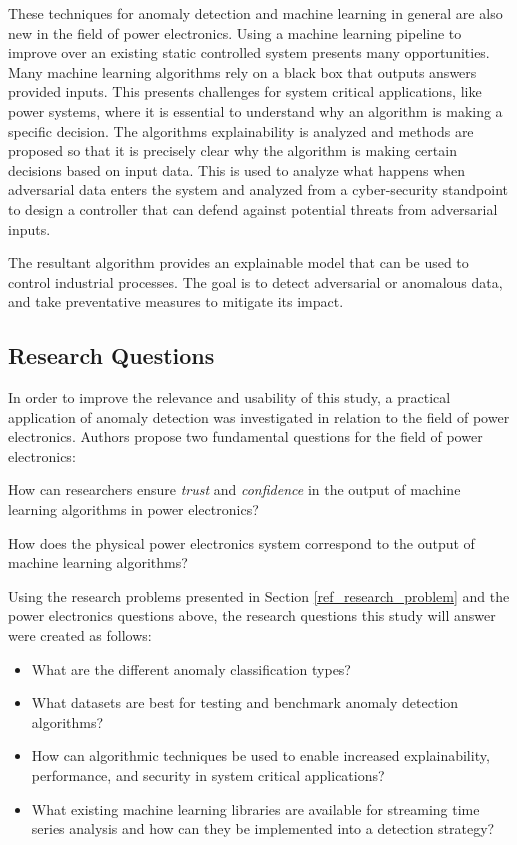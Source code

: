 These techniques for anomaly detection and machine learning in general are also new in the field of power electronics. Using a machine learning pipeline to improve over an existing static controlled system presents many opportunities. Many machine learning algorithms rely on a black box that outputs answers provided inputs. This presents challenges for system critical applications, like power systems, where it is essential to understand why an algorithm is making a specific decision. The algorithms explainability is analyzed and methods are proposed so that it is precisely clear why the algorithm is making certain decisions based on input data. This is used to analyze what happens when adversarial data enters the system and analyzed from a cyber-security standpoint to design a controller that can defend against potential threats from adversarial inputs.

The resultant algorithm provides an explainable model that can be used to control industrial processes. The goal is to detect adversarial or anomalous data, and take preventative measures to mitigate its impact.


\subsection{Research Questions}

In order to improve the relevance and usability of this study, a practical application of anomaly detection was investigated in relation to the field of power electronics.
Authors \cite{black-box-explainability} propose two fundamental questions for the field of power electronics:
\begin{inlinelist}
    \item How can researchers ensure \textit{trust} and \textit{confidence} in the output of machine learning algorithms in power electronics?
    \item How does the physical power electronics system correspond to the output of machine learning algorithms?
\end{inlinelist}

Using the research problems presented in Section \ref{ref_research_problem} and the power electronics questions above, the research questions this study will answer were created as follows:
\begin{itemize}
    \item What are the different anomaly classification types?
    \item What datasets are best for testing and benchmark anomaly detection algorithms?
    \item How can algorithmic techniques be used to enable increased explainability, performance, and security in system critical applications?
    \item What existing machine learning libraries are available for streaming time series analysis and how can they be implemented into a detection strategy?
\end{itemize}

